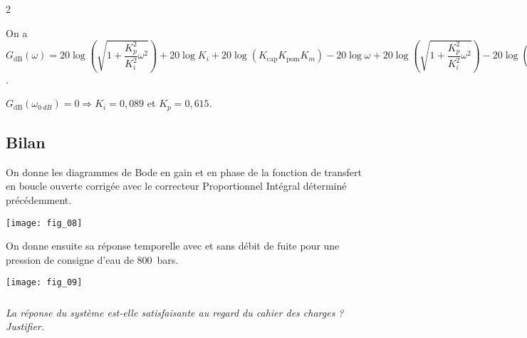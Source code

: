 \begin{multicols}{2}
\begin{corrige}
On a $G_{\text{dB}}(\omega)=20\log\left(\sqrt{1+\dfrac{K_p^2}{K_i^2}\omega^2} \right) + 20\log K_i +20\log\left( K_{\text{cap}}K_{\text{pom}}K_m\right)-20\log\omega +20\log\left(\sqrt{1+\dfrac{K_p^2}{K_i^2}\omega^2} \right)
-20\log\left(\sqrt{1+T_1^2\omega^2} \right)
-20\log\left(\sqrt{1+T_2^2\omega^2} \right)$. 

$G_{\text{dB}}\left(\omega_{\SI{0}{dB}}\right) =0 \Rightarrow K_i = 0,089$ et $K_p=0,615$.


\end{corrige}
\else
\fi

\subsection*{Bilan}

On donne les diagrammes de Bode en gain et en phase de la fonction de transfert en boucle ouverte corrigée avec le correcteur Proportionnel Intégral déterminé précédemment.

\begin{center}
\texttt{[image: fig\_08]}
\end{center}


On donne ensuite sa réponse temporelle avec et sans débit de fuite pour une pression de consigne d’eau de \SI{800}{bars}.


\begin{center}
\texttt{[image: fig\_09]}
\end{center}

\subparagraph{}
\textit{La réponse du système est-elle satisfaisante au regard du cahier des charges ? Justifier.}
\ifprof
\begin{corrige}

\end{corrige}
\else
\fi



\end{multicols}

%
%
%
%
%
%
%
%
%
%
%
%

